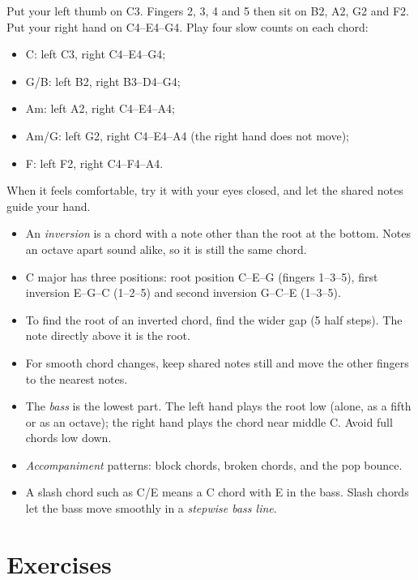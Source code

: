 \begin{labbox}
Put your left thumb on C3. Fingers 2, 3, 4 and 5 then sit on B2, A2, G2 and F2. Put your right hand on C4--E4--G4. Play four slow counts on each chord:
\begin{itemize}
  \item C: left C3, right C4--E4--G4;
  \item G/B: left B2, right B3--D4--G4;
  \item Am: left A2, right C4--E4--A4;
  \item Am/G: left G2, right C4--E4--A4 (the right hand does not move);
  \item F: left F2, right C4--F4--A4.
\end{itemize}
When it feels comfortable, try it with your eyes closed, and let the shared notes guide your hand.
\end{labbox}

\begin{summarybox}
\begin{itemize}
  \item An \emph{inversion} is a chord with a note other than the root at the bottom. Notes an octave apart sound alike, so it is still the same chord.
  \item C major has three positions: root position C--E--G (fingers 1--3--5), first inversion E--G--C (1--2--5) and second inversion G--C--E (1--3--5).
  \item To find the root of an inverted chord, find the wider gap (5 half steps). The note directly above it is the root.
  \item For smooth chord changes, keep shared notes still and move the other fingers to the nearest notes.
  \item The \emph{bass} is the lowest part. The left hand plays the root low (alone, as a fifth or as an octave); the right hand plays the chord near middle C. Avoid full chords low down.
  \item \emph{Accompaniment} patterns: block chords, broken chords, and the pop bounce.
  \item A slash chord such as C/E means a C chord with E in the bass. Slash chords let the bass move smoothly in a \emph{stepwise bass line}.
\end{itemize}
\end{summarybox}

\section*{Exercises}

